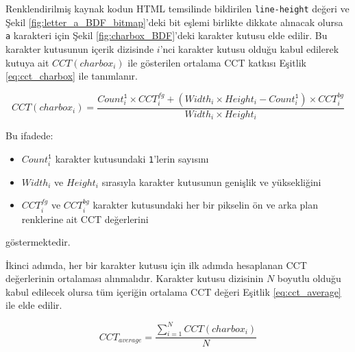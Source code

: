 \documentclass{article}
\begin{document}
Renklendirilmiş kaynak kodun HTML temsilinde bildirilen \texttt{line-height} değeri ve Şekil
\ref{fig:letter_a_BDF_bitmap}'deki bit eşlemi birlikte dikkate alınacak olursa \texttt{a} karakteri için Şekil
\ref{fig:charbox_BDF}'deki karakter kutusu elde edilir.  Bu karakter kutusunun içerik dizisinde $i$'nci karakter kutusu
olduğu kabul edilerek kutuya ait $CCT(charbox_{i})$ ile gösterilen ortalama CCT katkısı Eşitlik \ref{eq:cct_charbox} ile
tanımlanır.

\begin{equation}
	CCT(charbox_{i}) = \frac{
		Count_{i}^{\texttt{1}} \times CCT_{i}^{fg} +
		(Width_{i} \times Height_{i} - Count_{i}^{\texttt{1}}) \times CCT_{i}^{bg}
	}{
		Width_{i} \times Height_{i}
	}
	\label{eq:cct_charbox}
\end{equation}

Bu ifadede:

\begin{itemize}
	\item $Count_{i}^{\texttt{1}}$ karakter kutusundaki \texttt{1}'lerin sayısını
	\item $Width_{i}$ ve $Height_{i}$ sırasıyla karakter kutusunun genişlik ve yüksekliğini
	\item $CCT_{i}^{fg}$ ve $CCT_{i}^{bg}$ karakter kutusundaki her bir pikselin ön ve arka plan renklerine ait CCT değerlerini
\end{itemize}

göstermektedir.

İkinci adımda, her bir karakter kutusu için ilk adımda hesaplanan CCT değerlerinin ortalaması alınmalıdır. Karakter
kutusu dizisinin $N$ boyutlu olduğu kabul edilecek olursa tüm içeriğin ortalama CCT değeri Eşitlik
\ref{eq:cct_average} ile elde edilir.

\begin{equation}
  CCT_{average} = \frac{\sum_{i=1}^{N} CCT(charbox_{i})}{N}
	\label{eq:cct_average}
\end{equation}

\def\pixelmap_a{{%
  {0,0,0,0,0,0,0,0,0,0,0},
  {0,0,0,0,0,0,0,0,0,0,0},
  {0,0,0,0,0,0,0,0,0,0,0},
  {0,0,0,0,0,0,0,0,0,0,0},
  {0,0,0,0,0,0,0,0,0,0,0},
  {0,0,0,0,0,0,0,0,0,0,0},
  {0,0,0,0,0,0,0,0,0,0,0},
  {0,1,1,1,1,1,0,0,0,0,0},
  {0,1,0,0,0,1,0,0,0,0,0},
  {0,1,0,0,0,1,0,0,0,0,0},
  {0,0,1,1,1,1,0,0,0,0,0},
  {0,0,0,0,0,1,0,0,0,0,0},
  {0,1,0,0,0,1,0,0,0,0,0},
  {0,0,1,1,1,0,0,0,0,0,0},
  {0,0,0,0,0,0,0,0,0,0,0},
  {0,0,0,0,0,0,0,0,0,0,0},
  {0,0,0,0,0,0,0,0,0,0,0},
  {0,0,0,0,0,0,0,0,0,0,0},
  {0,0,0,0,0,0,0,0,0,0,0},
  {0,0,0,0,0,0,0,0,0,0,0},
  {0,0,0,0,0,0,0,0,0,0,0},
  {0,0,0,0,0,0,0,0,0,0,0},
}}
\end{document}
